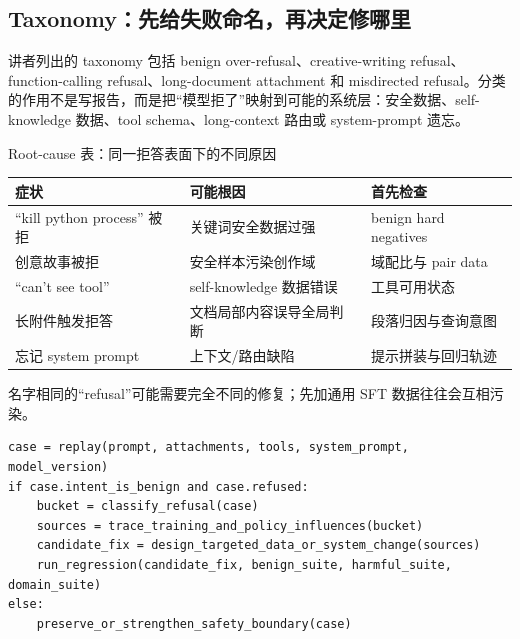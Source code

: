 \subsection{Taxonomy：先给失败命名，再决定修哪里}

讲者列出的 taxonomy 包括 benign over-refusal、creative-writing refusal、function-calling refusal、long-document attachment 和 misdirected refusal。分类的作用不是写报告，而是把“模型拒了”映射到可能的系统层：安全数据、self-knowledge 数据、tool schema、long-context 路由或 system-prompt 遗忘。



\begin{knowledgebox}{Root-cause 表：同一拒答表面下的不同原因}
\begin{tabularx}{\textwidth}{L{0.22\textwidth} X X}
\toprule
症状 & 可能根因 & 首先检查 \\
\midrule
``kill python process'' 被拒 & 关键词安全数据过强 & benign hard negatives \\
创意故事被拒 & 安全样本污染创作域 & 域配比与 pair data \\
``can't see tool'' & self-knowledge 数据错误 & 工具可用状态 \\
长附件触发拒答 & 文档局部内容误导全局判断 & 段落归因与查询意图 \\
忘记 system prompt & 上下文/路由缺陷 & 提示拼装与回归轨迹 \\
\bottomrule
\end{tabularx}
名字相同的“refusal”可能需要完全不同的修复；先加通用 SFT 数据往往会互相污染。
\end{knowledgebox}

\begin{lstlisting}[caption={拒答失败的最小分诊流程}]
case = replay(prompt, attachments, tools, system_prompt, model_version)
if case.intent_is_benign and case.refused:
    bucket = classify_refusal(case)
    sources = trace_training_and_policy_influences(bucket)
    candidate_fix = design_targeted_data_or_system_change(sources)
    run_regression(candidate_fix, benign_suite, harmful_suite, domain_suite)
else:
    preserve_or_strengthen_safety_boundary(case)
\end{lstlisting}


